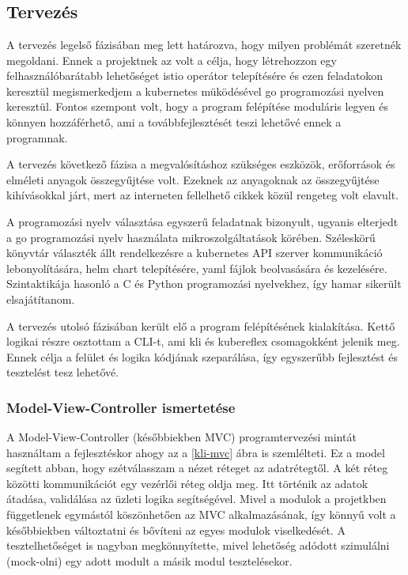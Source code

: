 \chapter{\kli}
\section{Tervezés}
A tervezés legelső fázisában meg lett határozva, hogy milyen problémát szeretnék megoldani.
Ennek a projektnek az volt a célja, hogy létrehozzon egy felhasználóbarátabb lehetőséget istio operátor telepítésére és ezen feladatokon keresztül megismerkedjem a kubernetes müködésével go programozási nyelven keresztül.
Fontos szempont volt, hogy a program felépítése moduláris legyen és könnyen hozzáférhető, ami a továbbfejlesztését teszi lehetővé ennek a programnak.

A tervezés következő fázisa a megvalósításhoz szükséges eszközök, erőforrások és elméleti anyagok összegyűjtése volt.
Ezeknek az anyagoknak az összegyűjtése kihívásokkal járt, mert az interneten fellelhető cikkek közül rengeteg volt elavult.

A programozási nyelv választása egyszerű feladatnak bizonyult, ugyanis elterjedt a go programozási nyelv használata mikroszolgáltatások körében.
Széleskörű könyvtár választék állt rendelkezésre a kubernetes API szerver kommunikáció lebonyolítására, helm chart telepítésére, yaml fájlok beolvasására és kezelésére.
Szintaktikája hasonló a C és Python programozási nyelvekhez, így hamar sikerült elsajátítanom.

A tervezés utolsó fázisában került elő a program felépítésének kialakítása.
Kettő logikai részre osztottam a CLI-t, ami kli és kubereflex csomagokként jelenik meg.
Ennek célja a felület és logika kódjának szeparálása, így egyszerűbb fejlesztést és tesztelést tesz lehetővé.

\newpage

\subsection*{Model-View-Controller ismertetése}
A Model-View-Controller (későbbiekben MVC) programtervezési mintát használtam a fejlesztéskor ahogy az a \ref{kli-mvc} ábra is szemlélteti.
Ez a model segített abban, hogy szétválasszam a nézet réteget az adatrétegtől.
A két réteg közötti kommunikációt egy vezérlői réteg oldja meg.
Itt történik az adatok átadása, validálása az üzleti logika segítségével.
Mivel a modulok a projetkben függetlenek egymástól köszönhetően az MVC alkalmazásának, így könnyű volt a későbbiekben változtatni és bővíteni az egyes modulok viselkedését.
A tesztelhetőséget is nagyban megkönnyítette, mivel lehetőség adódott szimulálni (mock-olni) egy adott modult a másik modul tesztelésekor.

